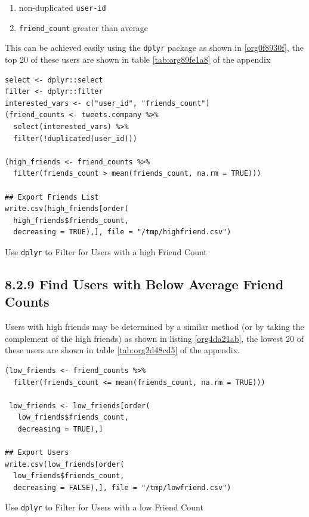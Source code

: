 \documentclass[11pt]{article}
\begin{document}
\begin{enumerate}
\item non-duplicated \texttt{user-id}
\item \texttt{friend\_count} greater than average
\end{enumerate}

This can be achieved easily using the \texttt{dplyr} package as shown in \ref{org0f8930f}, the top 20 of these users are shown in table \ref{tab:org89fe1a8} of the appendix

\begin{listing}[htbp]
\begin{verbatim}
select <- dplyr::select
filter <- dplyr::filter
interested_vars <- c("user_id", "friends_count")
(friend_counts <- tweets.company %>%
  select(interested_vars) %>%
  filter(!duplicated(user_id)))

(high_friends <- friend_counts %>%
  filter(friends_count > mean(friends_count, na.rm = TRUE)))

## Export Friends List
write.csv(high_friends[order(
  high_friends$friends_count,
  decreasing = TRUE),], file = "/tmp/highfriend.csv")
\end{verbatim}
\caption{\label{org0f8930f}Use \texttt{dplyr} to Filter for Users with a high Friend Count}
\end{listing}

\subsection{8.2.9 Find Users with Below Average Friend Counts}
\label{sec:orge30455f}
Users with high friends may be determined by a similar method (or by taking the complement of the high friends) as shown in listing \ref{org4da21ab}, the lowest 20 of these users are shown in table \ref{tab:org2d48cd5} of the appendix.

\begin{listing}[htbp]
\begin{verbatim}
(low_friends <- friend_counts %>%
  filter(friends_count <= mean(friends_count, na.rm = TRUE)))

 low_friends <- low_friends[order(
   low_friends$friends_count,
   decreasing = TRUE),]

## Export Users
write.csv(low_friends[order(
  low_friends$friends_count,
  decreasing = FALSE),], file = "/tmp/lowfriend.csv")
\end{verbatim}
\caption{\label{org4da21ab}Use \texttt{dplyr} to Filter for Users with a low Friend Count}
\end{listing}
\end{document}
